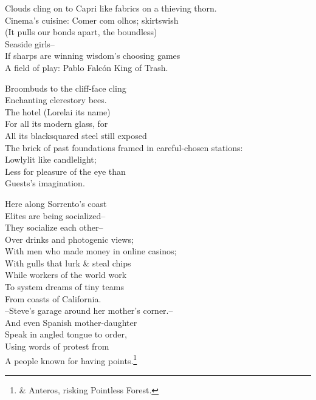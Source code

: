 Clouds cling on to Capri like fabrics on a thieving thorn. \\
Cinema's cuisine: Comer com olhos; skirtswish \\
(It pulls our bonds apart, the boundless) \\
Seaside girls-- \\
If sharps are winning wisdom's choosing games \\
A field of play: Pablo Falcón King of Trash.

Broombuds to the cliff-face cling \\
Enchanting clerestory bees. \\
The hotel (Lorelai its name) \\
For all its modern glass, for \\
All its blacksquared steel still exposed \\
The brick of past foundations framed in careful-chosen stations: \\
Lowlylit like candlelight; \\
Less for pleasure of the eye than \\
Guests's imagination.

Here along Sorrento's coast \\
Elites are being socialized-- \\
They socialize each other-- \\
Over drinks and photogenic views; \\
With men who made money in online casinos; \\
With gulls that lurk \& steal chips \\
While workers of the world work \\
To system dreams of tiny teams \\
From coasts of California. \\
--Steve's garage around her mother's corner.-- \\
And even Spanish mother-daughter \\
Speak in angled tongue to order, \\
Using words of protest from \\
A people known for having points.\footnote{\& Anteros, risking Pointless Forest.} 

